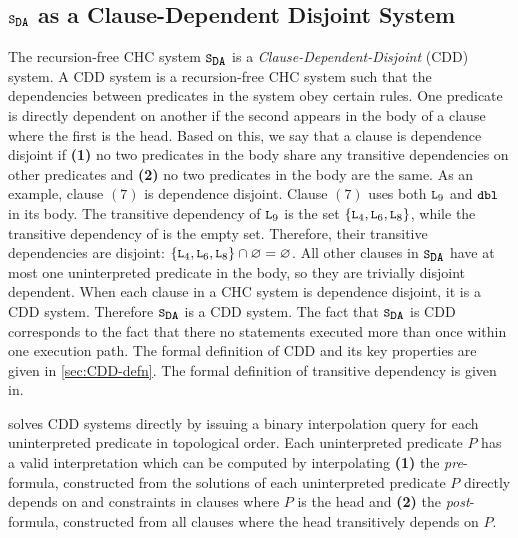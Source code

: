 \subsection{$\mcchc$ as a Clause-Dependent Disjoint System}
\label{sec:solve-ex}
The recursion-free CHC system $\mcchc$ is a
\emph{Clause-Dependent-Disjoint} (CDD) system.
A CDD system is a recursion-free CHC system such that
the dependencies between predicates in the system obey certain rules.
%
One predicate is directly dependent on another if the second appears
in the body of a clause where the first is the head.
%
Based on this, we say that a clause is dependence disjoint if
\textbf{(1)} no two predicates in the body share any transitive
dependencies on other predicates and \textbf{(2)} no two predicates in
the body are the same.
As an example, clause $(7)$ is dependence disjoint. Clause $(7)$ uses
both $\cc{L}_9$ and $\cc{dbl}$ in its body.
%
The transitive dependency of $\cc{L}_9$ is the set
$\{\cc{L}_4,\cc{L}_6,\cc{L}_8\}$, while the transitive dependency of
 is the empty set.
%
Therefore, their transitive dependencies are disjoint:
$\{\cc{L}_4,\cc{L}_6,\cc{L}_8\} \cap \varnothing = \varnothing$.
%
All other clauses in $\mcchc$ have at most one uninterpreted predicate
in the body, so they are trivially disjoint dependent.
%
When each clause in a CHC system is dependence disjoint, it is a CDD
system. Therefore $\mcchc$ is a CDD system.
%
The fact that $\mcchc$ is CDD corresponds to the fact that there no
statements executed more than once within one execution path.
%
The formal definition of CDD and its key properties are given in
\autoref{sec:CDD-defn}.
The formal definition of transitive dependency is given in.
%

\sys solves CDD systems directly by issuing a binary interpolation
query for each uninterpreted predicate in topological order.
%
Each uninterpreted predicate $P$ has a valid interpretation which can
be computed by interpolating
\textbf{(1)} the \emph{pre}-formula, constructed from the solutions of
each uninterpreted predicate $P$ directly depends on and constraints
in clauses where $P$ is the head and
\textbf{(2)} the \emph{post}-formula, constructed from
all clauses where the head transitively depends on $P$.
%

